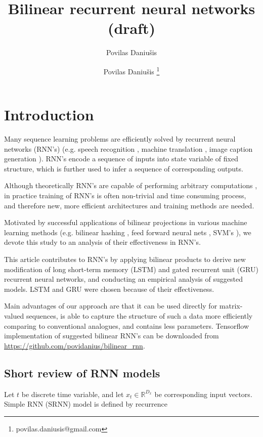 \documentclass[a4paper,11pt]{article}
\author{Povilas Daniu\v{s}is}
\author[1]{Povilas Daniu\v{s}is \thanks{povilas.daniusis@gmail.com}}
\title{Bilinear recurrent neural networks (draft)}
\begin{document}
\maketitle
\section{Introduction}

Many sequence learning problems are efficiently solved by recurrent neural networks (RNN's) (e.g. speech recognition \cite{Sak}, machine translation \cite{Sutskever}, image caption generation \cite{Vinyals}). RNN's encode a sequence of inputs into state variable of fixed structure, which is further used to infer a sequence of corresponding outputs. 



Although theoretically RNN's are capable of performing arbitrary computations \cite{Siegelmann}, in practice training of RNN's is often non-trivial and time consuming process, and therefore new, more efficient architectures and training methods are needed.



Motivated by successful applications of bilinear projections in
various machine learning methods (e.g. bilinear hashing \cite{Gong}, feed forward neural nets \cite{Daniusis}, SVM's \cite{Cai}), we devote this study to an analysis of their effectiveness in RNN's.


This article contributes to RNN's by applying bilinear products to derive new modification of long short-term memory (LSTM) \cite{Hochreiter} and gated recurrent unit (GRU) \cite{Chung} recurrent neural networks, and conducting an empirical analysis of suggested models. LSTM and GRU were chosen because of their effectiveness.

Main advantages of our approach are that it can be used directly for matrix-valued sequences, is able to capture the structure of such a data more efficiently comparing to conventional analogues, and contains less parameters. Tensorflow \cite{Tensorflow} implementation of suggested bilinear RNN's can be downloaded from \url{https://github.com/povidanius/bilinear_rnn}.




\subsection{Short review of RNN models}

Let $t$ be discrete time variable, and let $x_{t} \in \mathbb{R}^{D_{x}}$ be corresponding input vectors. Simple RNN (SRNN) model is defined by 
recurrence 
\end{document}
